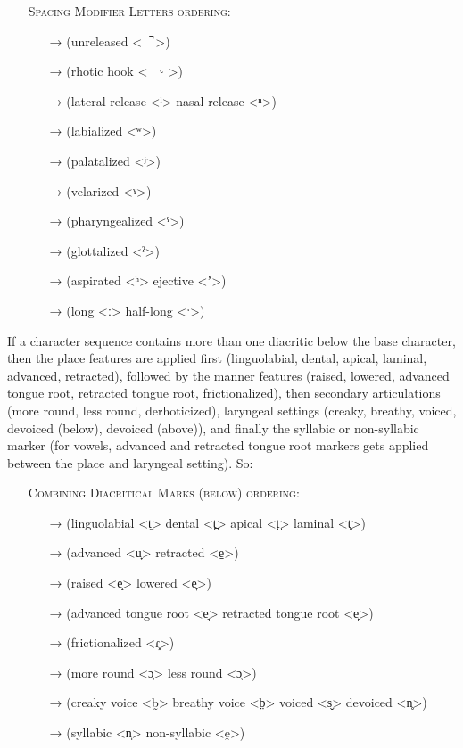 \begin{itemize}
	\item[] \textsc{Spacing Modifier Letters ordering:}
	\begin{itemize}
	  \item[→] (unreleased <\ \ ̚ >)
	  \item[→] (rhotic hook <\ \ ˞ >)
	  \item[→] (lateral release <ˡ> \textbar{} nasal release <ⁿ>)
	  \item[→] (labialized <ʷ>)
	  \item[→] (palatalized <ʲ>)
	  \item[→] (velarized <ˠ>)
	  \item[→] (pharyngealized <ˤ>)
	  \item[→] (glottalized <ˀ>)
	  \item[→] (aspirated <ʰ> \textbar{} ejective <ʼ>)
	  \item[→] (long <ː> \textbar{} half-long <ˑ>)
	\end{itemize}
\end{itemize}

If a character sequence contains more than one diacritic below the base
character, then the place features are applied first (linguolabial, dental, apical, laminal, advanced, 
retracted), followed by the manner features (raised, lowered, advanced tongue root, 
retracted tongue root, frictionalized), then secondary articulations (more round, less round, 
derhoticized), laryngeal settings (creaky, breathy, voiced, devoiced (below), devoiced (above)), and finally the syllabic or non-syllabic
marker (for vowels, advanced and retracted tongue root markers gets applied between the place and laryngeal setting).
So:

\begin{itemize}
	\item[] \textsc{Combining Diacritical Marks (below) ordering:}
	\begin{itemize}	
	  \item[→] (linguolabial <t̼> \textbar{} dental <t̪> \textbar{} apical <t̺> \textbar{} laminal <t̻>)
	  \item[→] (advanced <u̟> \textbar{} retracted <e̠>)	 
	  \item[→] (raised <e̝> \textbar{} lowered <e̞>) 
	  \item[→] (advanced tongue root <e̘> \textbar{} retracted tongue root <e̙>)
	  \item[→] (frictionalized <ɾ͓>)
	  \item[→] (more round <ɔ̹> \textbar{} less round <ɔ̜>)
	  \item[→] (creaky voice <b̰> \textbar{} breathy voice <b̤> \textbar{} voiced <s̬> \textbar{} devoiced <n̥>)
	  \item[→] (syllabic <n̩> \textbar{} non-syllabic <e̯>)
	\end{itemize}
 \end{itemize}

